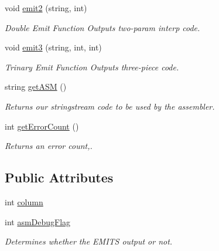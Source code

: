 \begin{DoxyCompactItemize}
void \hyperlink{classAdmin_a7862a90db685a8321e47d684c67b6451}{emit2} (string, int)
\begin{DoxyCompactList}\small\item\em Double Emit Function Outputs two-\/param interp code. \item\end{DoxyCompactList}\item 
void \hyperlink{classAdmin_ab97fe62f8c41b03f21082f5a9bc7ecfa}{emit3} (string, int, int)
\begin{DoxyCompactList}\small\item\em Trinary Emit Function Outputs three-\/piece code. \item\end{DoxyCompactList}\item 
string \hyperlink{classAdmin_a40cf08260b4ca4200791ed3f13080153}{getASM} ()
\begin{DoxyCompactList}\small\item\em Returns our stringstream code to be used by the assembler. \item\end{DoxyCompactList}\item 
int \hyperlink{classAdmin_a1740ce0bc2f182fd337cb3d44a15b3fb}{getErrorCount} ()
\begin{DoxyCompactList}\small\item\em Returns an error count,. \item\end{DoxyCompactList}\end{DoxyCompactItemize}
\subsection*{Public Attributes}
\begin{DoxyCompactItemize}
\item 
int \hyperlink{classAdmin_ae6bcb0d3aa08b938197a332c5af5a456}{column}
\item 
int \hyperlink{classAdmin_ac243ca073c9295f7a451089724093fae}{asmDebugFlag}
\begin{DoxyCompactList}\small\item\em Determines whether the EMITS output or not. \item\end{DoxyCompactList}\end{DoxyCompactItemize}
